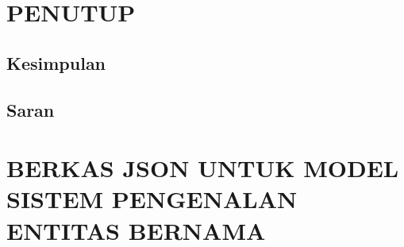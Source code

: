 \documentclass[ugmskripsi]{ugmskripsi}
\begin{document}


\chapter{PENUTUP}
\label{PENUTUP}

	\section{Kesimpulan}
	\label{penutup kesimpulan}
	

	\section{Saran}
	\label{penutup saran}
	


% 

\clearpage
\nocite{*}



\appendix

\chapter{BERKAS JSON UNTUK MODEL SISTEM PENGENALAN ENTITAS BERNAMA}
\label{BERKAS JSON UNTUK MODEL SISTEM PENGENALAN ENTITAS BERNAMA}


\end{document}
